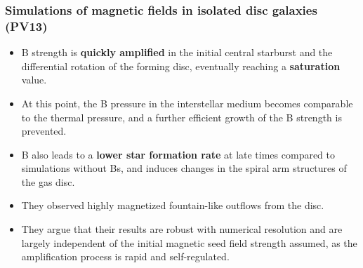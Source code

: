 \documentclass[10pt,aspectratio=169]{beamer}
\begin{document}
\begin{frame}
	\frametitle{Simulations of magnetic fields in isolated disc galaxies (PV13)}	
	\begin{itemize}
		\item B strength is \textbf{quickly amplified} in the initial central starburst and the differential rotation of the forming disc, eventually reaching a \textbf{saturation} value.
		\item At this point, the B pressure in the interstellar medium becomes comparable to the
		thermal pressure, and a further efficient growth of the B strength is prevented.
		\item B also leads to a \textbf{lower star formation rate} at late times compared to simulations without Bs, and induces changes in the spiral arm structures of the gas disc. 
		\item They observed highly magnetized fountain-like outflows from the disc.
		\item They argue that their results are robust with numerical resolution and are largely independent of the initial magnetic seed field strength assumed, as the amplification process is rapid and self-regulated.
	\end{itemize}
\end{frame}
\end{document}
